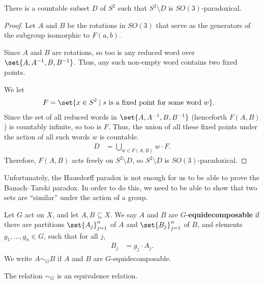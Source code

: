 \begin{theorem}
  There is a countable subset $D$ of $S^{2}$ such that $S^{2}\setminus D$ is $SO(3)$-paradoxical.
\end{theorem}
\begin{proof}
  Let $A$ and $B$ be the rotations in $SO(3)$ that serve as the generators of the subgroup isomorphic to $F(a,b)$.\newline

  Since $A$ and $B$ are rotations, so too is any reduced word over $\set{A,A^{-1},B,B^{-1}}$. Thus, any such non-empty word contains two fixed points.\newline

  We let
  \begin{align*}
    F &= \set{x\in S^{2}\mid s\text{ is a fixed point for some word }w}.
  \end{align*}
  Since the set of all reduced words in $\set{A,A^{-1},B,B^{-1}}$ (henceforth $F(A,B)$) is countably infinite, so too is $F$. Thus, the union of all these fixed points under the action of all such words $w$ is countable.
  \begin{align*}
    D &= \bigcup_{w\in F(A,B)} w\cdot F.
  \end{align*}
  Therefore, $F(A,B)$ acts freely on $S^{2}\setminus D$, so $S^{2}\setminus D$ is $SO(3)$-paradoxical.
\end{proof}
Unfortunately, the Hausdorff paradox is not enough for us to be able to prove the Banach--Tarski paradox. In order to do this, we need to be able to show that two sets are ``similar'' under the action of a group.
\begin{definition}
  Let $G$ act on $X$, and let $A,B\subseteq X$. We say $A$ and $B$ are $G$-\textbf{equidecomposable} if there are partitions $\set{A_j}_{j=1}^{n}$ of $A$ and $\set{B_j}_{j=1}^{n}$ of $B$, and elements $g_1,\dots,g_n\in G$, such that for all $j$,
  \begin{align*}
    B_j &= g_j\cdot A_j.
  \end{align*}
  We write $A\sim_{G}B$ if $A$ and $B$ are $G$-equidecomposable.
\end{definition}
\begin{fact}
  The relation $\sim_{G}$ is an equivalence relation.
\end{fact}
